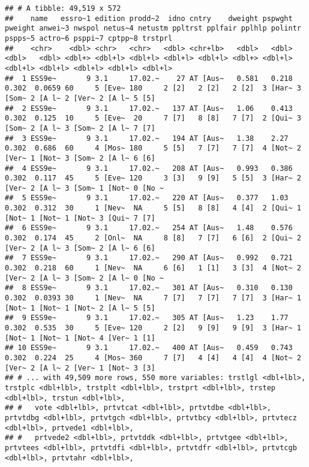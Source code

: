 \documentclass[
]{book}
\begin{document}
\begin{verbatim}
## # A tibble: 49,519 x 572
##    name   essro~1 edition prodd~2  idno cntry    dweight pspwght pweight anwei~3 nwspol netus~4 netustm ppltrst pplfair pplhlp polintr pspps~5 actro~6 psppi~7 cptpp~8 trstprl
##    <chr>    <dbl> <chr>   <chr>   <dbl> <chr+lb>   <dbl>   <dbl>   <dbl>   <dbl> <dbl+> <dbl+l> <dbl+l> <dbl+l> <dbl+l> <dbl+> <dbl+l> <dbl+l> <dbl+l> <dbl+l> <dbl+l> <dbl+l>
##  1 ESS9e~       9 3.1     17.02.~    27 AT [Aus~   0.581   0.218   0.302  0.0659 60     5 [Eve~ 180     2 [2]   2 [2]   2 [2]  3 [Har~ 3 [Som~ 2 [A l~ 2 [Ver~ 2 [A l~ 5 [5]  
##  2 ESS9e~       9 3.1     17.02.~   137 AT [Aus~   1.06    0.413   0.302  0.125  10     5 [Eve~  20     7 [7]   8 [8]   7 [7]  2 [Qui~ 3 [Som~ 2 [A l~ 3 [Som~ 2 [A l~ 7 [7]  
##  3 ESS9e~       9 3.1     17.02.~   194 AT [Aus~   1.38    2.27    0.302  0.686  60     4 [Mos~ 180     5 [5]   7 [7]   7 [7]  4 [Not~ 2 [Ver~ 1 [Not~ 3 [Som~ 2 [A l~ 6 [6]  
##  4 ESS9e~       9 3.1     17.02.~   208 AT [Aus~   0.993   0.386   0.302  0.117  45     5 [Eve~ 120     3 [3]   9 [9]   5 [5]  3 [Har~ 2 [Ver~ 2 [A l~ 3 [Som~ 1 [Not~ 0 [No ~
##  5 ESS9e~       9 3.1     17.02.~   220 AT [Aus~   0.377   1.03    0.302  0.312  30     1 [Nev~  NA     5 [5]   8 [8]   4 [4]  2 [Qui~ 1 [Not~ 1 [Not~ 1 [Not~ 3 [Qui~ 7 [7]  
##  6 ESS9e~       9 3.1     17.02.~   254 AT [Aus~   1.48    0.576   0.302  0.174  45     2 [Onl~  NA     8 [8]   7 [7]   6 [6]  2 [Qui~ 2 [Ver~ 2 [A l~ 3 [Som~ 2 [A l~ 6 [6]  
##  7 ESS9e~       9 3.1     17.02.~   290 AT [Aus~   0.992   0.721   0.302  0.218  60     1 [Nev~  NA     6 [6]   1 [1]   3 [3]  4 [Not~ 2 [Ver~ 2 [A l~ 3 [Som~ 2 [A l~ 0 [No ~
##  8 ESS9e~       9 3.1     17.02.~   301 AT [Aus~   0.310   0.130   0.302  0.0393 30     1 [Nev~  NA     7 [7]   7 [7]   7 [7]  3 [Har~ 1 [Not~ 1 [Not~ 1 [Not~ 2 [A l~ 5 [5]  
##  9 ESS9e~       9 3.1     17.02.~   305 AT [Aus~   1.23    1.77    0.302  0.535  30     5 [Eve~ 120     2 [2]   9 [9]   9 [9]  3 [Har~ 1 [Not~ 1 [Not~ 1 [Not~ 4 [Ver~ 1 [1]  
## 10 ESS9e~       9 3.1     17.02.~   400 AT [Aus~   0.459   0.743   0.302  0.224  25     4 [Mos~ 360     7 [7]   4 [4]   4 [4]  4 [Not~ 2 [Ver~ 2 [A l~ 2 [Ver~ 1 [Not~ 3 [3]  
## # ... with 49,509 more rows, 550 more variables: trstlgl <dbl+lbl>, trstplc <dbl+lbl>, trstplt <dbl+lbl>, trstprt <dbl+lbl>, trstep <dbl+lbl>, trstun <dbl+lbl>,
## #   vote <dbl+lbl>, prtvtcat <dbl+lbl>, prtvtdbe <dbl+lbl>, prtvtdbg <dbl+lbl>, prtvtgch <dbl+lbl>, prtvtbcy <dbl+lbl>, prtvtecz <dbl+lbl>, prtvede1 <dbl+lbl>,
## #   prtvede2 <dbl+lbl>, prtvtddk <dbl+lbl>, prtvtgee <dbl+lbl>, prtvtees <dbl+lbl>, prtvtdfi <dbl+lbl>, prtvtdfr <dbl+lbl>, prtvtcgb <dbl+lbl>, prtvtahr <dbl+lbl>,

\end{verbatim}
\end{document}
